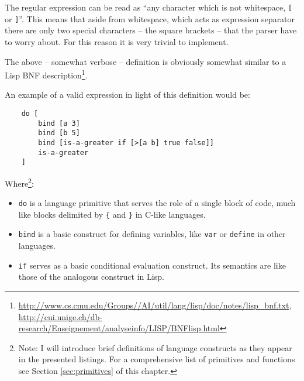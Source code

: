 The regular expression can be read as ``any character which is not whitespace, \texttt{[} or \texttt{]}''. This means that aside from whitespace, which acts as expression separator there are only two special characters -- the square brackets -- that the parser have to worry about. For this reason it is very trivial to implement.

The above -- somewhat verbose -- definition is obviously somewhat similar to a Lisp BNF description\footnote{\url{http://www.cs.cmu.edu/Groups//AI/util/lang/lisp/doc/notes/lisp_bnf.txt}, \url{http://cui.unige.ch/db-research/Enseignement/analyseinfo/LISP/BNFlisp.html}}.

An example of a valid expression in light of this definition would be:
\begin{lstlisting}
    do [
        bind [a 3]
        bind [b 5]
        bind [is-a-greater if [>[a b] true false]]
        is-a-greater
    ]
\end{lstlisting}

Where\footnote{Note: I will introduce brief definitions of language constructs as they appear in the presented listings. For a comprehensive list of primitives and functions see Section \ref{sec:primitives} of this chapter.}:
\begin{itemize}
    \item \texttt{do} is a language primitive that serves the role of a single block of code, much like blocks delimited by \texttt{\{} and \texttt{\}} in C-like languages.
    \item \texttt{bind} is a basic construct for defining variables, like \texttt{var} or \texttt{define} in other languages.
    \item \texttt{if} serves as a basic conditional evaluation construct. Its semantics are like those of the analogous construct in Lisp.
\end{itemize}

